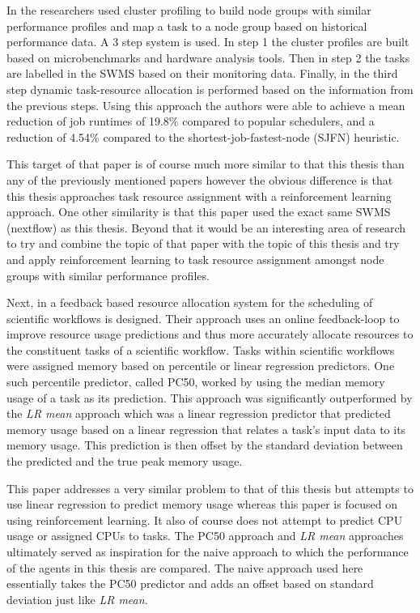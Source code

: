  In \cite{tarema} the researchers used cluster profiling to build node groups with similar performance profiles and map a task to a node group based on historical performance data. A 3 step system is used. In step 1 the cluster profiles are built based on microbenchmarks and hardware analysis tools. Then in step 2 the tasks are labelled in the SWMS based on their monitoring data. Finally, in the third step dynamic task-resource allocation is performed based on the information from the previous steps. Using this approach the authors were able to achieve a mean reduction of job runtimes of 19.8\% compared to popular schedulers, and a reduction of 4.54\% compared to the shortest-job-fastest-node (SJFN) heuristic. 

This target of that paper is of course much more similar to that this thesis than any of the previously mentioned papers however the obvious difference is that this thesis approaches task resource assignment with a reinforcement learning approach. One other similarity is that this paper used the exact same SWMS (nextflow) as this thesis. Beyond that it would be an interesting area of research to try and combine the topic of that paper with the topic of this thesis and try and apply reinforcement learning to task resource assignment amongst node groups with similar performance profiles.

Next, in \cite{FeedbackBasedAllocation} a feedback based resource allocation system for the scheduling of scientific workflows is designed. Their approach uses an online feedback-loop to improve resource usage predictions and thus more accurately allocate resources to the constituent tasks of a scientific workflow. Tasks within scientific workflows were assigned memory based on percentile or linear regression predictors. One such percentile predictor, called PC50, worked by using the median memory usage of a task as its prediction. This approach was significantly outperformed by the \textit{LR mean} approach which was a linear regression predictor that predicted memory usage based on a linear regression that relates a task’s input data to its memory usage. This prediction is then offset by the standard deviation between the predicted and the true peak memory usage.

This paper addresses a very similar problem to that of this thesis but attempts to use linear regression to predict memory usage whereas this paper is focused on using reinforcement learning. It also of course does not attempt to predict CPU usage or assigned CPUs to tasks. The PC50 approach and \textit{LR mean} approaches ultimately served as inspiration for the naive approach to which the performance of the agents in this thesis are compared. The naive approach used here essentially takes the PC50 predictor and adds an offset based on standard deviation just like \textit{LR mean}. 

